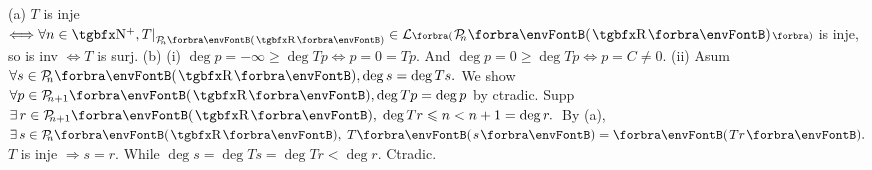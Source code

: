 
(a) $T$ is inje $\Longleftrightarrow\forall n\in\Nbp,T\mmid_{\PoR[\SmallPar]{n}}\in\Lm[\BigPar]{\PoR{n}}$ is inje, so is inv $\Longleftrightarrow T$ is surj.\vspace{2pt}\parSol{}
(b) (i) $\deg p=-\infty\geqslant\deg Tp\Longleftrightarrow p=0=Tp.$ \;And $\deg p=0\geqslant\deg Tp\Longleftrightarrow p=C\neq 0.$\parSol{\vspace{1pt}\Endi\Hb}
(ii) Asum $\forall s\in\PoR{n},\deg s=\deg Ts.$ We show $\forall p\in\PoR{n+1},\deg Tp=\deg p$ by ctradic.\vspace{1pt}\parSol{\Hii\Hb}
Supp $\exists\,r\in\PoR{n+1},\;\deg Tr\leqslant n<n+1=\deg r.$ \,By (a), $\exists\,s\in\PoR{n},\;T\Par{s}=\Par{Tr}.$\parSol{\Hii\Hb}
\又 $T$ is inje $\Rightarrow s=r.$ While $\deg s=\deg Ts=\deg Tr<\deg r.$ Ctradic.\PfEnd
\SepLine\pagebreak

